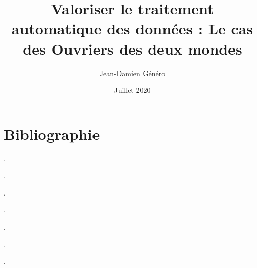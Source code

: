 \documentclass[a4paper,twoside,12pt]{book}
\title{Valoriser le traitement automatique des données : Le cas des Ouvriers des deux mondes}
\author{Jean-Damien Généro}
\date{Juillet 2020}
\begin{document}
\frontmatter

\clearpage
\thispagestyle{empty}
\cleardoublepage

\clearpage
\thispagestyle{empty}
\cleardoublepage

\clearpage
\thispagestyle{empty}
\cleardoublepage

\clearpage
\thispagestyle{empty}
\cleardoublepage


\mainmatter


\backmatter
\part*{Bibliographie}

\cite{inria}.

\cite{baciocchi}.

\cite{cardoni}.

\cite{chague}.

\cite{chenu}.

\cite{lefourner}

\cite{lorry}.

\cite{savoye}.

\tableofcontents
\end{document}
